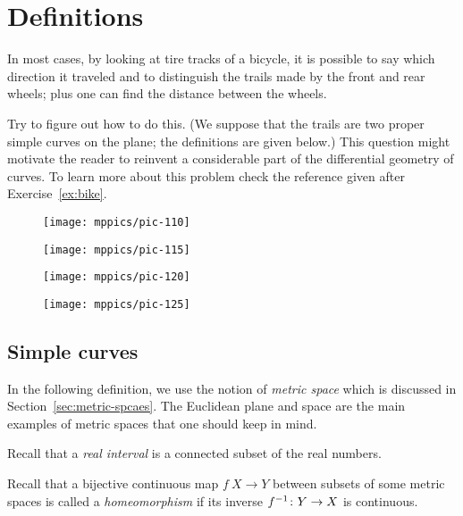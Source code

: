 \chapter{Definitions}
\label{chap:curves-def}

In most cases, by looking at tire tracks of a bicycle,
it is possible to say which direction it traveled and to distinguish the trails made by the front and rear wheels;
plus one can find the distance between the wheels.

Try to figure out how to do this.
(We suppose that the trails are two proper simple curves on the plane; the definitions are given below.)
This question might motivate the reader to reinvent a considerable part of the differential geometry of curves.
To learn more about this problem check the reference given after Exercise~\ref{ex:bike}.

\vskip-0mm
\begin{figure}[h!]
\begin{minipage}{.48\textwidth}
\centering
\texttt{[image: mppics/pic-110]}
\end{minipage}\hfill
\begin{minipage}{.48\textwidth}
\centering
\texttt{[image: mppics/pic-115]}
\end{minipage}
\bigskip
\begin{minipage}{.48\textwidth}
\centering
\texttt{[image: mppics/pic-120]}
\end{minipage}\hfill
\begin{minipage}{.48\textwidth}
\centering
\texttt{[image: mppics/pic-125]}
\end{minipage}
\end{figure}
\vskip-10mm

\section{Simple curves}

In the following definition, we use the notion of {}\emph{metric space} which is discussed in Section~\ref{sec:metric-spcaes}.
The Euclidean plane and space are the main examples of metric spaces that one should keep in mind.

Recall that a \emph{real interval} is a connected subset of the real numbers.

Recall that a bijective continuous map $f\:X\to Y$ between subsets of some metric spaces is called a {}\emph{homeomorphism} if its inverse $f^{-1}\:Y\z\to X$ is continuous.  

